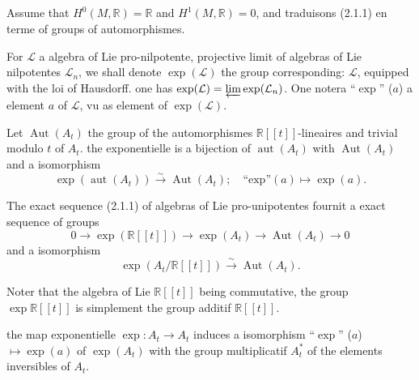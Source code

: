 \documentclass[11pt,a4paper]{article}
\theoremstyle{plain}
\theoremstyle{definition}
\DeclareMathOperator{\Aut}{Aut}
\DeclareMathOperator{\aut}{aut}
\newcommand{\R}{\mathbb{R}}
\newcommand{\iso}{\xrightarrow{\sim}}
\begin{document}
\subsection{}
Assume that $H^{0}(M,\R) = \R$ and $H^{1}(M,\R) = 0$, and traduisons (2.1.1) en terme of groups of automorphismes.

For $\mathcal{L}$ a algebra of Lie pro-nilpotente, projective limit of algebras of Lie nilpotentes $\mathcal{L}_{n}$, we shall denote $\exp(\mathcal{L})$ the group corresponding: $\mathcal{L}$, equipped with the loi of Hausdorff. one has $\exp(\mathcal{L}) = \varprojlim \exp(\mathcal{L}_{n})$. One notera ``$\exp$'' ($a$) a element $a$ of $\mathcal{L}$, vu as element of $\exp(\mathcal{L})$.

Let $\Aut(A_{t})$ the group of the automorphismes $\R[[t]]$-lineaires and trivial modulo $t$ of $A_{t}$. the exponentielle is a bijection of $\aut(A_{t})$ with $\Aut(A_{t})$ and a isomorphism
\[
\exp(\aut(A_{t})) \iso \Aut(A_{t}); \quad \text{``exp''}(a) \longmapsto \exp(a).
\]

The exact sequence (2.1.1) of algebras of Lie pro-unipotentes fournit a exact sequence of groups
\begin{equation}
0 \longrightarrow \exp(\R[[t]]) \longrightarrow \exp(A_{t}) \longrightarrow \Aut(A_{t}) \longrightarrow 0 \tag{2.2.1}
\end{equation}
and a isomorphism
\begin{equation}
\exp(A_{t}/\R[[t]]) \iso \Aut(A_{t}). \tag{2.2.2}
\end{equation}

Noter that the algebra of Lie $\R[[t]]$ being commutative, the group $\exp \R[[t]]$ is simplement the group additif $\R[[t]]$.

the map exponentielle $\exp: A_{t} \to A_{t}$ induces a isomorphism ``$\exp$'' ($a$) $\mapsto \exp(a)$ of $\exp(A_{t})$ with the group multiplicatif $A_{t}^{*}$ of the elements inversibles of $A_{t}$.
\end{document}

